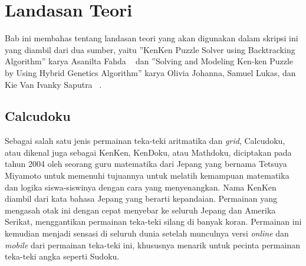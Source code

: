 \chapter{Landasan Teori}
\label{chap:teori}

Bab ini membahas tentang landasan teori yang akan digunakan dalam skripsi ini yang diambil dari dua sumber, yaitu ''KenKen Puzzle Solver using Backtracking Algorithm'' karya Asanilta Fahda ~\cite{fahda:16:backtracking} dan ''Solving and Modeling Ken-ken Puzzle by Using Hybrid Genetics Algorithm'' karya Olivia Johanna, Samuel Lukas, dan Kie Van Ivanky Saputra ~\cite{johanna:12:hybrid}.

\section{Calcudoku ~\cite{fahda:16:backtracking} ~\cite{johanna:12:hybrid}}
\label{sec:calcudoku}
Sebagai salah satu jenis permainan teka-teki aritmatika dan \textit{grid}, Calcudoku, atau dikenal juga sebagai KenKen, KenDoku, atau Mathdoku, diciptakan pada tahun 2004 oleh seorang guru matematika dari Jepang yang bernama Tetsuya Miyamoto untuk memenuhi tujuannya untuk melatih kemampuan matematika dan logika siswa-siswinya dengan cara yang menyenangkan. Nama KenKen diambil dari kata bahasa Jepang yang berarti kepandaian. Permainan yang mengasah otak ini dengan cepat menyebar ke seluruh Jepang dan Amerika Serikat, menggantikan permainan teka-teki silang di banyak koran. Permainan ini kemudian menjadi sensasi di seluruh dunia setelah munculnya versi \textit{online} dan \textit{mobile} dari permainan teka-teki ini, khususnya menarik untuk pecinta permainan teka-teki angka seperti Sudoku.

